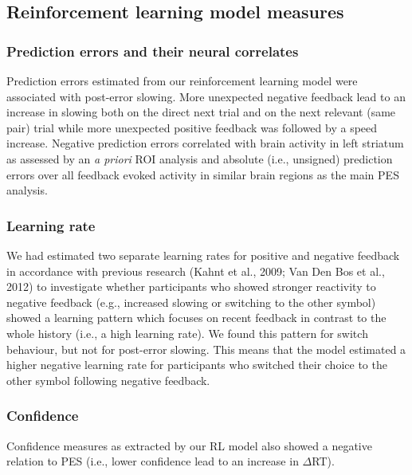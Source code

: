\documentclass[12pt,openany]{book}
\theoremstyle{definition}
\theoremstyle{definition}
\theoremstyle{definition}
\theoremstyle{remark}
\begin{document}
\subsection{Reinforcement learning model
measures}\label{reinforcement-learning-model-measures}

\subsubsection{Prediction errors and their neural
correlates}\label{prediction-errors-and-their-neural-correlates}

Prediction errors estimated from our reinforcement learning model were
associated with post-error slowing. More unexpected negative feedback
lead to an increase in slowing both on the direct next trial and on the
next relevant (same pair) trial while more unexpected positive feedback
was followed by a speed increase. Negative prediction errors correlated
with brain activity in left striatum as assessed by an \emph{a priori}
ROI analysis and absolute (i.e., unsigned) prediction errors over all
feedback evoked activity in similar brain regions as the main PES
analysis.

\subsubsection{Learning rate}\label{learning-rate}

We had estimated two separate learning rates for positive and negative
feedback in accordance with previous research (Kahnt et al., 2009; Van
Den Bos et al., 2012) to investigate whether participants who showed
stronger reactivity to negative feedback (e.g., increased slowing or
switching to the other symbol) showed a learning pattern which focuses
on recent feedback in contrast to the whole history (i.e., a high
learning rate). We found this pattern for switch behaviour, but not for
post-error slowing. This means that the model estimated a higher
negative learning rate for participants who switched their choice to the
other symbol following negative feedback.

\subsubsection{Confidence}\label{confidence}

Confidence measures as extracted by our RL model also showed a negative
relation to PES (i.e., lower confidence lead to an increase in
\(\Delta\)RT).
\end{document}
